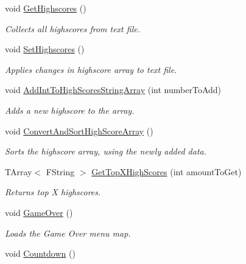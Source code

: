 \begin{DoxyCompactItemize}
void \mbox{\hyperlink{class_a_user_interface_manager_a60cd439b46ed433c1d37b9eb5da7a419}{Get\+Highscores}} ()
\begin{DoxyCompactList}\small\item\em Collects all highscores from text file. \end{DoxyCompactList}\item 
void \mbox{\hyperlink{class_a_user_interface_manager_a7d590e3c68674c78cce8f0af9a787504}{Set\+Highscores}} ()
\begin{DoxyCompactList}\small\item\em Applies changes in highscore array to text file. \end{DoxyCompactList}\item 
void \mbox{\hyperlink{class_a_user_interface_manager_afa99d2da551223255ec04b264c0666ad}{Add\+Int\+To\+High\+Scores\+String\+Array}} (int number\+To\+Add)
\begin{DoxyCompactList}\small\item\em Adds a new highscore to the array. \end{DoxyCompactList}\item 
void \mbox{\hyperlink{class_a_user_interface_manager_af1a58dc6b34721339b356b53efb54e45}{Convert\+And\+Sort\+High\+Score\+Array}} ()
\begin{DoxyCompactList}\small\item\em Sorts the highscore array, using the newly added data. \end{DoxyCompactList}\item 
T\+Array$<$ F\+String $>$ \mbox{\hyperlink{class_a_user_interface_manager_a10887916bdb9f032b3e9b0782a2326a5}{Get\+Top\+X\+High\+Scores}} (int amount\+To\+Get)
\begin{DoxyCompactList}\small\item\em Returns top X highscores. \end{DoxyCompactList}\item 
void \mbox{\hyperlink{class_a_user_interface_manager_aa77f6ee265e9eb803e587e124242e545}{Game\+Over}} ()
\begin{DoxyCompactList}\small\item\em Loads the Game Over menu map. \end{DoxyCompactList}\item 
\mbox{\label{class_a_user_interface_manager_af3e35993c6a778b2d1dd50e377839296}} 
void \mbox{\hyperlink{class_a_user_interface_manager_af3e35993c6a778b2d1dd50e377839296}{Countdown}} ()

\end{DoxyCompactItemize}
